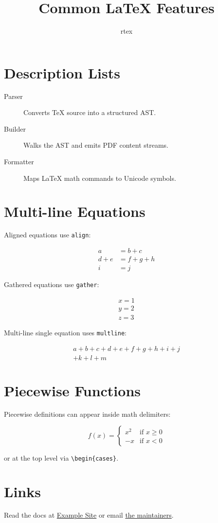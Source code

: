 \documentclass{article}
\title{Common LaTeX Features}
\author{rtex}
\begin{document}
\maketitle

\section{Description Lists}

\begin{description}
  \item[Parser] Converts TeX source into a structured AST.
  \item[Builder] Walks the AST and emits PDF content streams.
  \item[Formatter] Maps LaTeX math commands to Unicode symbols.
\end{description}

\section{Multi-line Equations}

Aligned equations use \texttt{align}:

\begin{align}
    a &= b + c \\
    d + e &= f + g + h \\
    i &= j
\end{align}

Gathered equations use \texttt{gather}:

\begin{gather}
    x = 1 \\
    y = 2 \\
    z = 3
\end{gather}

Multi-line single equation uses \texttt{multline}:

\begin{multline}
    a + b + c + d + e + f + g + h + i + j \\
    + k + l + m
\end{multline}

\section{Piecewise Functions}

Piecewise definitions can appear inside math delimiters:

\[
    f(x) = \begin{cases}
        x^2  & \text{if } x \geq 0 \\
        -x   & \text{if } x < 0
    \end{cases}
\]

or at the top level via \texttt{\textbackslash begin\{cases\}}.

\section{Links}

Read the docs at \href{https://example.com}{Example Site} or email
\href{mailto:hello@example.com}{the maintainers}.
\end{document}
